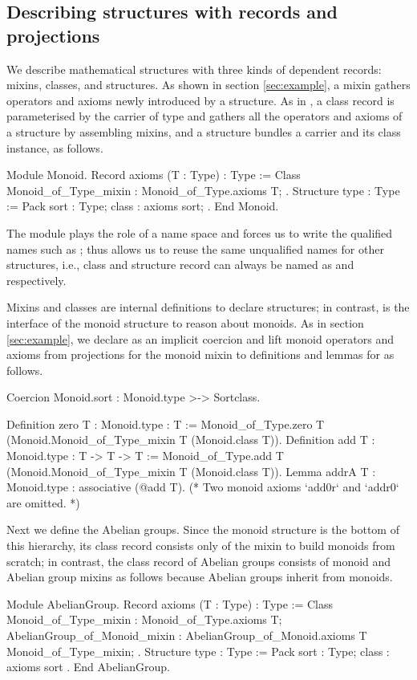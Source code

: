 \documentclass[a4paper,UKenglish,cleveref, autoref]{lipics-v2019}
\theoremstyle{implem}
\theoremstyle{implem}
\theoremstyle{command}
\begin{document}
\subsection{Describing structures with records and projections}

We describe mathematical structures with three kinds of dependent records: mixins, classes, and structures.
As shown in section \ref{sec:example}, a mixin gathers operators and axioms newly introduced by a structure.
As in \cite[section 2.4]{DBLP:conf/tphol/GarillotGMR09}\cite[section 2]{KSdraft}, a class record is parameterised by the carrier of type  and gathers all the operators and axioms of a structure by assembling mixins, and a structure  bundles a carrier and its class instance, as follows.
\begin{coqcode}
Module Monoid.
Record axioms (T : Type) : Type :=
  Class { Monoid_of_Type_mixin : Monoid_of_Type.axioms T; }.
Structure type : Type := Pack { sort : Type; class : axioms sort; }.
End Monoid.
\end{coqcode}
The  module plays the role of a name space and forces us to write the qualified names such as ; thus allows us to reuse the same unqualified names for other structures, i.e., class and structure record can always be named as  and  respectively.

Mixins and classes are internal definitions to declare structures; in contrast,  is the interface of the monoid structure to reason about monoids.
As in section \ref{sec:example}, we declare  as an implicit coercion and lift monoid operators and axioms from projections for the monoid mixin to definitions and lemmas for  as follows.
\begin{coqcode}
Coercion Monoid.sort : Monoid.type >-> Sortclass.

Definition zero {T : Monoid.type} : T :=
  Monoid_of_Type.zero T (Monoid.Monoid_of_Type_mixin T (Monoid.class T)).
Definition add {T : Monoid.type} : T -> T -> T :=
  Monoid_of_Type.add T (Monoid.Monoid_of_Type_mixin T (Monoid.class T)).
Lemma addrA {T : Monoid.type} : associative (@add T).
(* Two monoid axioms `add0r` and `addr0` are omitted. *)
\end{coqcode}

Next we define the Abelian groups.
Since the monoid structure is the bottom of this hierarchy, its class record consists only of the mixin to build monoids from scratch; in contrast, the class record of Abelian groups consists of monoid and Abelian group mixins as follows because Abelian groups inherit from monoids.
\begin{coqcode}
Module AbelianGroup.
Record axioms (T : Type) : Type := Class {
  Monoid_of_Type_mixin : Monoid_of_Type.axioms T;
  AbelianGroup_of_Monoid_mixin : AbelianGroup_of_Monoid.axioms T Monoid_of_Type_mixin; }.
Structure type : Type := Pack { sort : Type; class : axioms sort }.
End AbelianGroup.
\end{coqcode}
\end{document}
